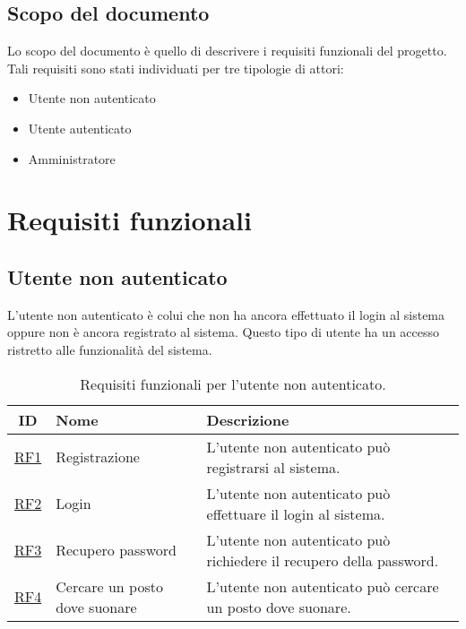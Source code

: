 \documentclass[12pt, a4paper]{article}
\begin{document}
\subsection{Scopo del documento}

Lo scopo del documento è quello di descrivere i requisiti funzionali del progetto.
Tali requisiti sono stati individuati per tre tipologie di attori:
\begin{itemize}
    \item Utente non autenticato
    \item Utente autenticato
    \item Amministratore
\end{itemize}

\section{Requisiti funzionali}
\subsection{Utente non autenticato}

L'utente non autenticato è colui che non ha ancora effettuato il login al sistema oppure non è ancora registrato al sistema. Questo tipo di utente ha un accesso ristretto alle funzionalità del sistema.



\begin{table}[h]
    \centering
    \caption{Requisiti funzionali per l'utente non autenticato.}
    \label{tab:requisiti utente non autenticato}
    \begin{tabular}{|c|p{5cm}|p{5cm}|}
        \hline \textbf{ID}          & \textbf{Nome}                 & \textbf{Descrizione}                                                \\  \hline
        \hline \hyperlink{RF1}{RF1} & Registrazione                 & L'utente non autenticato può registrarsi al sistema.                \\ \hline
        \hline \hyperlink{RF2}{RF2} & Login                         & L'utente non autenticato può effettuare il login al sistema.        \\ \hline
        \hline \hyperlink{RF3}{RF3} & Recupero password             & L'utente non autenticato può richiedere il recupero della password. \\ \hline
        \hline \hyperlink{RF4}{RF4} & Cercare un posto dove suonare & L'utente non autenticato può cercare un posto dove suonare.         \\ \hline
    \end{tabular}
\end{table}
\end{document}
